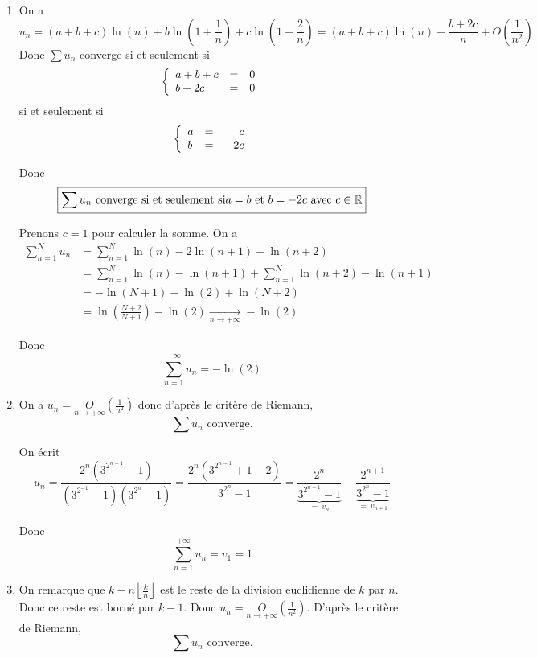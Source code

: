 \begin{solution}
	\phantom{}
	\begin{enumerate}
		\item On a 
		$$u_{n}=(a+b+c)\ln(n)+b\ln\left(1+\frac{1}{n}\right)+c\ln\left(1+\frac{2}{n}\right)=(a+b+c)\ln(n)+\frac{b+2c}{n}+O\left(\frac{1}{n^{2}}\right)$$
		Donc $\sum u_{n}$ converge si et seulement si 
		$$
		\left\{
			\begin{array}[]{lcr}
				a+b+c &= &0\\
				b+2c &= &0
			\end{array}
		\right.
		$$
		si et seulement si 
		$$
		\left\{
			\begin{array}[]{lcr}
				a &= &c\\
				b &= &-2c
			\end{array}
		\right.
		$$

		Donc 
		$$\boxed{\sum u_{n}\text{ converge si et seulement si} a=b\text{ et }b=-2c\text{ avec }c\in\mathbb{R}}$$

		Prenons $c=1$ pour calculer la somme. On a 
		\begin{align*}
			\sum_{n=1}^{N}u_{n}
			&=\sum_{n=1}^{N}\ln(n)-2\ln(n+1)+\ln(n+2)\\
			&=\sum_{n=1}^{N}\ln(n)-\ln(n+1)+\sum_{n=1}^{N}\ln(n+2)-\ln(n+1)\\
			&=-\ln(N+1)-\ln(2)+\ln(N+2)\\
			&=\ln\left(\frac{N+2}{N+1}\right)-\ln(2)\xrightarrow[n\to+\infty]{}-\ln(2)
		\end{align*}

		Donc 
		$$\boxed{\sum_{n=1}^{+\infty}u_{n}=-\ln(2)}$$

		\item On a $u_{n}=\underset{n\to+\infty}{O}\left(\frac{1}{n^{2}}\right)$ donc d'après le critère de Riemann,
		$$\boxed{\sum u_{n}\text{ converge.}}$$

		On écrit 
		$$u_{n}=\frac{2^{n}\left(3^{2^{n-1}}-1\right)}{\left(3^{2^{-1}}+1\right)\left(3^{2^{n}}-1\right)}=\frac{2^{n}\left(3^{2^{n-1}}+1-2\right)}{3^{2^{n}}-1}=\underbrace{\frac{2^{n}}{3^{2^{n-1}}-1}}_{=~v_{n}}-\underbrace{\frac{2^{n+1}}{3^{2^{n}}-1}}_{=~v_{n+1}}$$

		Donc 
		$$\boxed{\sum_{n=1}^{+\infty}u_{n}=v_{1}=1}$$

		\item On remarque que $k-n\left\lfloor\frac{k}{n}\right\rfloor$ est le reste de la division euclidienne de $k$ par $n$. Donc ce reste est borné par $k-1$. Donc $u_{n}=\underset{n\to+\infty}{O}\left(\frac{1}{n^{2}}\right)$. D'après le critère de Riemann,
		$$\boxed{\sum u_{n}\text{ converge.}}$$


\end{enumerate}
\end{solution}
